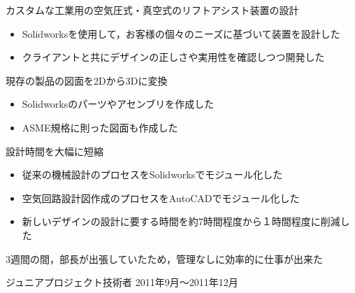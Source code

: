 \documentclass[10pt, a4paper]{article}
\begin{document}
\begin{outerlist}
  \begin{innerlist}
  \item カスタムな工業用の空気圧式・真空式のリフトアシスト装置の設計
  \begin{itemize}
    \item Solidworksを使用して，お客様の個々のニーズに基づいて装置を設計した
    \item クライアントと共にデザインの正しさや実用性を確認しつつ開発した
  \end{itemize}
  \item 現存の製品の図面を2Dから3Dに変換
  \begin{itemize}
    \item Solidworksのパーツやアセンブリを作成した
    \item ASME規格に則った図面も作成した
  \end{itemize}
  \item 設計時間を大幅に短縮
  \begin{itemize}
    \item 従来の機械設計のプロセスをSolidworksでモジュール化した
    \item 空気回路設計図作成のプロセスをAutoCADでモジュール化した
    \item 新しいデザインの設計に要する時間を約7時間程度から１時間程度に削減した
  \end{itemize}
  \item 3週間の間，部長が出張していたため，管理なしに効率的に仕事が出来た
  \end{innerlist}

\item[\href{http://www.kqbikes.com/}{\parbox[t]{3cm}{\raggedleft Kevin Quan Studios有限会社}}]{ジュニアプロジェクト技術者} \hfill {2011年9月〜2011年12月}


\end{outerlist}
\end{document}
